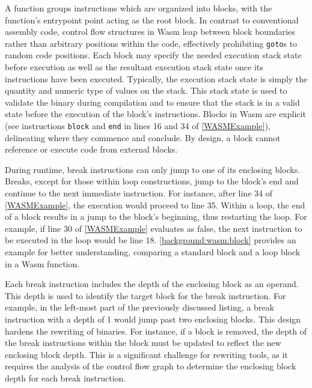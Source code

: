 

A \Wasm function groups instructions which are organized into blocks, with the function's entrypoint point acting as the root block. 
In contrast to conventional assembly code, control flow structures in Wasm leap between block boundaries rather than arbitrary positions within the code, effectively prohibiting \texttt{goto}s to random code positions. 
Each block may specify the needed execution stack state before execution as well as the resultant execution stack state once its instructions have been executed.
Typically, the execution stack state is simply the quantity and numeric type of values on the stack. 
This stack state is used to validate the binary during compilation and to ensure that the stack is in a valid state before the execution of the block's instructions.
Blocks in Wasm are explicit (see instructions \texttt{block} and \texttt{end} in lines 16 and 34 of \autoref{WASMExample}), delineating where they commence and conclude.
By design, a block cannot reference or execute code from external blocks.


During runtime, \Wasm break instructions can only jump to one of its enclosing blocks. 
Breaks, except for those within loop constructions, jump to the block's end and continue to the next immediate instruction. 
For instance, after line 34 of \autoref{WASMExample}, the execution would proceed to line 35. 
Within a loop, the end of a block results in a jump to the block's beginning, thus restarting the loop. 
For example, if line 30 of \autoref{WASMExample} evaluates as false, the next instruction to be executed in the loop would be line 18. 
\autoref{background:wasm:block} provides an example for better understanding, comparing a standard block and a loop block in a Wasm function.



Each break instruction includes the depth of the enclosing block as an operand. 
This depth is used to identify the target block for the break instruction. 
For example, in the left-most part of the previously discussed listing, a break instruction with a depth of 1 would jump past two enclosing blocks.
This design hardens the rewriting of \wasm binaries.
For instance, if a block is removed, the depth of the break instructions within the block must be updated to reflect the new enclosing block depth.
This is a significant challenge for rewriting tools, as it requires the analysis of the control flow graph to determine the enclosing block depth for each break instruction.

